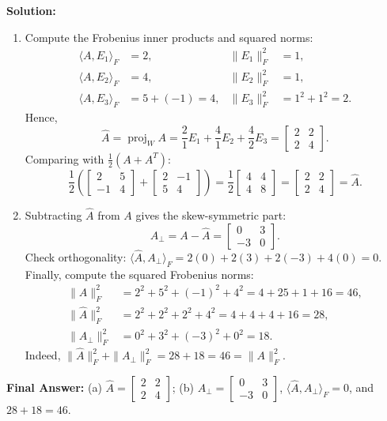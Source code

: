 \documentclass[11pt, letterpaper]{article}
\theoremstyle{definition}
\theoremstyle{remark}
\begin{document}
\textbf{Solution:}
\begin{enumerate}[label=(\alph*)]
    \item Compute the Frobenius inner products and squared norms:
    \begin{align*}
    \langle A, E_1 \rangle_F &= 2, & \|E_1\|_F^2 &= 1, \\
    \langle A, E_2 \rangle_F &= 4, & \|E_2\|_F^2 &= 1, \\
    \langle A, E_3 \rangle_F &= 5 + (-1) = 4, & \|E_3\|_F^2 &= 1^2 + 1^2 = 2.
    \end{align*}
    Hence,
    \[
    \hat{A} = \operatorname{proj}_W A = \frac{2}{1}E_1 + \frac{4}{1}E_2 + \frac{4}{2}E_3 = \begin{bmatrix} 2 & 2 \\ 2 & 4 \end{bmatrix}.
    \]
    Comparing with $\frac{1}{2}(A + A^T)$:
    \[
    \frac{1}{2}\left(\begin{bmatrix} 2 & 5 \\ -1 & 4 \end{bmatrix} + \begin{bmatrix} 2 & -1 \\ 5 & 4 \end{bmatrix}\right) = \frac{1}{2}\begin{bmatrix} 4 & 4 \\ 4 & 8 \end{bmatrix} = \begin{bmatrix} 2 & 2 \\ 2 & 4 \end{bmatrix} = \hat{A}.
    \]
    \item Subtracting $\hat{A}$ from $A$ gives the skew-symmetric part:
    \[
    A_\perp = A - \hat{A} = \begin{bmatrix} 0 & 3 \\ -3 & 0 \end{bmatrix}.
    \]
    Check orthogonality: $\langle \hat{A}, A_\perp \rangle_F = 2(0) + 2(3) + 2(-3) + 4(0) = 0$. Finally, compute the squared Frobenius norms:
    \begin{align*}
    \|A\|_F^2 &= 2^2 + 5^2 + (-1)^2 + 4^2 = 4 + 25 + 1 + 16 = 46, \\
    \|\hat{A}\|_F^2 &= 2^2 + 2^2 + 2^2 + 4^2 = 4 + 4 + 4 + 16 = 28, \\
    \|A_\perp\|_F^2 &= 0^2 + 3^2 + (-3)^2 + 0^2 = 18.
    \end{align*}
    Indeed, $\|\hat{A}\|_F^2 + \|A_\perp\|_F^2 = 28 + 18 = 46 = \|A\|_F^2$.
\end{enumerate}
\textbf{Final Answer:} (a) $\hat{A} = \begin{bmatrix} 2 & 2 \\ 2 & 4 \end{bmatrix}$; (b) $A_\perp = \begin{bmatrix} 0 & 3 \\ -3 & 0 \end{bmatrix}$, $\langle \hat{A}, A_\perp \rangle_F = 0$, and $28 + 18 = 46$.
\end{document}
